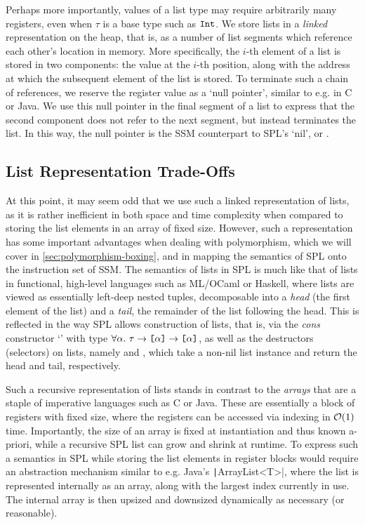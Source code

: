 Perhaps more importantly, values of a list type \code{[$\tau$]} may require
arbitrarily many registers, even when $\tau$ is a base type such as $\texttt{Int}$.
We store lists in a \emph{linked} representation on the heap, that is, as a
number of list segments which reference each other's location in memory.
More specifically, the $i$-th element of a list is stored in two components: the
value at the $i$-th position, along with the address at which the subsequent
element of the list is stored.
To terminate such a chain of references, we reserve the register value
 as a `null pointer', similar to e.g.  in C or Java.
We use this null pointer in the final segment of a list to express that the
second component does not refer to the next segment, but instead terminates the
list. In this way, the null pointer is the SSM counterpart to SPL's `nil', or
\spl{[]}.

\subsection{List Representation Trade-Offs}
At this point, it may seem odd that we use such a linked representation of
lists, as it is rather inefficient in both space and time complexity when
compared to storing the list elements in an array of fixed size.
However, such a representation has some important advantages when dealing with
polymorphism, which we will cover in \cref{sec:polymorphism-boxing}, and in
mapping the semantics of SPL onto the instruction set of SSM.
The semantics of lists in SPL is much like that of lists in functional,
high-level languages such as ML/OCaml or Haskell, where lists are viewed as
essentially left-deep nested tuples, decomposable into a \emph{head} (the first
element of the list) and a \emph{tail}, the remainder of the list following the
head. This is reflected in the way SPL allows construction of lists, that is,
via the \emph{cons} constructor `\spl{:}' with type
$\forall \alpha.\ \tau \to \TList{\alpha} \to \TList{\alpha}$, as well as the
destructors (selectors) on lists, namely  and , which take a
non-nil list instance and return the head and tail, respectively.

Such a recursive representation of lists stands in contrast to the \emph{arrays}
that are a staple of imperative languages such as C or Java. These are
essentially a block of registers with fixed size, where the registers can be
accessed via indexing in $\mathcal{O}(1)$ time.
Importantly, the size of an array is fixed at instantiation and thus known
a-priori, while a recursive SPL list can grow and shrink at runtime. To express
such a semantics in SPL while storing the list elements in register blocks would
require an abstraction mechanism similar to e.g. Java's
\texttt|ArrayList<T>|, where the list is represented internally as an
array, along with the largest index currently in use. The internal array is then
upsized and downsized dynamically as necessary (or reasonable).

